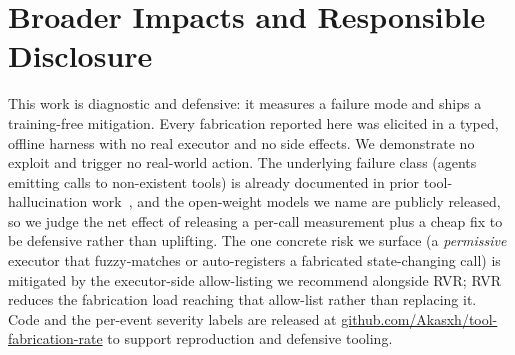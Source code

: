 \section{Broader Impacts and Responsible Disclosure}
\label{sec:appendix:impacts}
This work is diagnostic and defensive: it measures a failure mode and
ships a training-free mitigation. Every fabrication reported here was
elicited in a typed, offline harness with no real executor and no side
effects. We demonstrate no exploit and trigger no real-world action.
The underlying failure class (agents emitting calls to non-existent
tools) is already documented in prior tool-hallucination
work~\citep{li2023apibank,huang2024metatool}, and the open-weight models
we name are publicly released, so we judge the net effect of releasing a
per-call measurement plus a cheap fix to be defensive rather than
uplifting. The one concrete risk we surface (a \emph{permissive}
executor that fuzzy-matches or auto-registers a fabricated
state-changing call) is mitigated by the executor-side allow-listing
we recommend alongside RVR; RVR reduces the fabrication load reaching
that allow-list rather than replacing it. Code and the per-event
severity labels are released at
\href{https://github.com/Akasxh/tool-fabrication-rate}{github.com/Akasxh/tool-fabrication-rate}
to support reproduction and defensive tooling.
